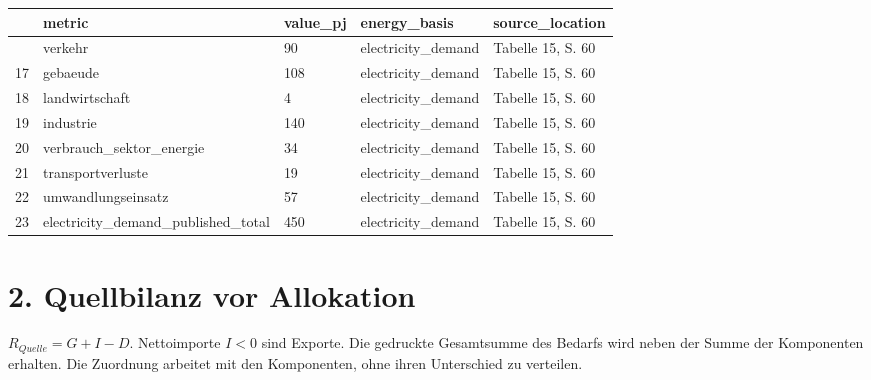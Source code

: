 \documentclass[
  ngerman,
  a4paper,
  DIV=11]{scrreprt}
\newcounter{none} %
\begin{document}
{\def\LTcaptype{none} %
\begin{longtable}[]{@{}lllll@{}}
\toprule\noalign{}
& metric & value\_pj & energy\_basis & source\_location \\
\midrule\noalign{}
\endhead
\bottomrule\noalign{}
\endlastfoot
16 & verkehr & 90 & electricity\_demand & Tabelle 15, S. 60 \\
17 & gebaeude & 108 & electricity\_demand & Tabelle 15, S. 60 \\
18 & landwirtschaft & 4 & electricity\_demand & Tabelle 15, S. 60 \\
19 & industrie & 140 & electricity\_demand & Tabelle 15, S. 60 \\
20 & verbrauch\_sektor\_energie & 34 & electricity\_demand & Tabelle 15,
S. 60 \\
21 & transportverluste & 19 & electricity\_demand & Tabelle 15, S. 60 \\
22 & umwandlungseinsatz & 57 & electricity\_demand & Tabelle 15, S.
60 \\
23 & electricity\_demand\_published\_total & 450 & electricity\_demand &
Tabelle 15, S. 60 \\
\end{longtable}
}

\section{2. Quellbilanz vor
Allokation}\label{quellbilanz-vor-allokation}

\(R_{Quelle}=G+I-D\). Nettoimporte \(I<0\) sind Exporte. Die gedruckte
Gesamtsumme des Bedarfs wird neben der Summe der Komponenten erhalten.
Die Zuordnung arbeitet mit den Komponenten, ohne ihren Unterschied zu
verteilen.
\end{document}
